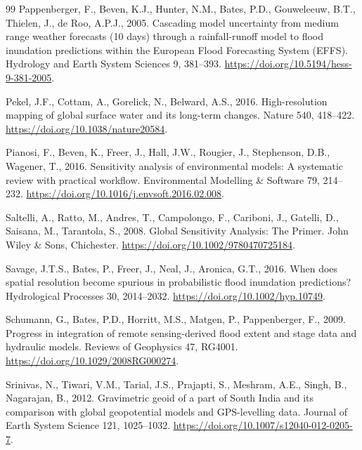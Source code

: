 \documentclass[preprint,12pt,authoryear]{elsarticle}
\begin{document}
\begin{thebibliography}{99}
Pappenberger, F., Beven, K.J., Hunter, N.M., Bates, P.D., Gouweleeuw, B.T., Thielen, J., de Roo, A.P.J., 2005. Cascading model uncertainty from medium range weather forecasts (10 days) through a rainfall-runoff model to flood inundation predictions within the European Flood Forecasting System ({EFFS}). Hydrology and Earth System Sciences 9, 381--393. \url{https://doi.org/10.5194/hess-9-381-2005}.

Pekel, J.F., Cottam, A., Gorelick, N., Belward, A.S., 2016. High-resolution mapping of global surface water and its long-term changes. Nature 540, 418--422. \url{https://doi.org/10.1038/nature20584}.

Pianosi, F., Beven, K., Freer, J., Hall, J.W., Rougier, J., Stephenson, D.B., Wagener, T., 2016. Sensitivity analysis of environmental models: A systematic review with practical workflow. Environmental Modelling \& Software 79, 214--232. \url{https://doi.org/10.1016/j.envsoft.2016.02.008}.

Saltelli, A., Ratto, M., Andres, T., Campolongo, F., Cariboni, J., Gatelli, D., Saisana, M., Tarantola, S., 2008. Global Sensitivity Analysis: The Primer. John Wiley \& Sons, Chichester. \url{https://doi.org/10.1002/9780470725184}.

Savage, J.T.S., Bates, P., Freer, J., Neal, J., Aronica, G.T., 2016. When does spatial resolution become spurious in probabilistic flood inundation predictions? Hydrological Processes 30, 2014--2032. \url{https://doi.org/10.1002/hyp.10749}.

Schumann, G., Bates, P.D., Horritt, M.S., Matgen, P., Pappenberger, F., 2009. Progress in integration of remote sensing-derived flood extent and stage data and hydraulic models. Reviews of Geophysics 47, RG4001. \url{https://doi.org/10.1029/2008RG000274}.

Srinivas, N., Tiwari, V.M., Tarial, J.S., Prajapti, S., Meshram, A.E., Singh, B., Nagarajan, B., 2012. Gravimetric geoid of a part of South India and its comparison with global geopotential models and GPS-levelling data. Journal of Earth System Science 121, 1025--1032. \url{https://doi.org/10.1007/s12040-012-0205-7}.


\end{thebibliography}
\end{document}
